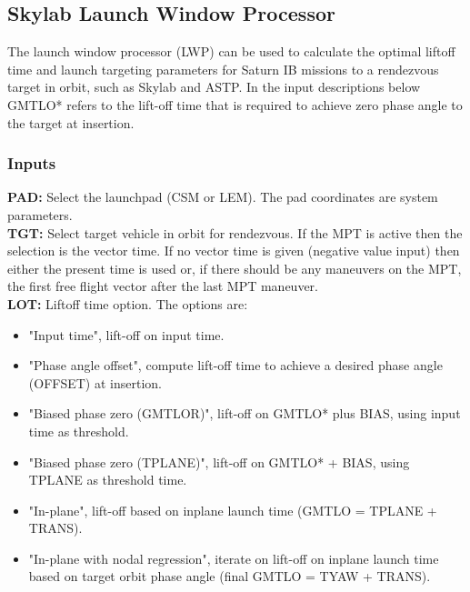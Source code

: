 \documentclass[11pt]{article} %
\begin{document}
\subsection{Skylab Launch Window Processor}

The launch window processor (LWP) can be used to calculate the optimal liftoff time and launch targeting parameters for Saturn IB missions to a rendezvous target in orbit, such as Skylab and ASTP. In the input descriptions below GMTLO* refers to the lift-off time that is required to achieve zero phase angle to the target at insertion.
\subsubsection{Inputs}

\textbf{PAD:} Select the launchpad (CSM or LEM). The pad coordinates are system parameters.\\
\textbf{TGT:} Select target vehicle in orbit for rendezvous. If the MPT is active then the selection is the vector time. If no vector time is given (negative value input) then either the present time is used or, if there should be any maneuvers on the MPT, the first free flight vector after the last MPT maneuver.\\
\textbf{LOT:} Liftoff time option. The options are: 

\begin{itemize}
\item{"Input time", lift-off on input time.}
\item{"Phase angle offset", compute lift-off time to achieve a desired phase angle (OFFSET) at insertion.}
\item{"Biased phase zero (GMTLOR)", lift-off on GMTLO* plus BIAS, using input time as threshold.}
\item{"Biased phase zero (TPLANE)", lift-off on GMTLO* + BIAS, using TPLANE as threshold time.}
\item{"In-plane", lift-off based on inplane launch time (GMTLO = TPLANE + TRANS).}
\item{"In-plane with nodal regression", iterate on lift-off on inplane launch time based on target orbit phase angle (final GMTLO = TYAW + TRANS).}
\end{itemize}
\end{document}
